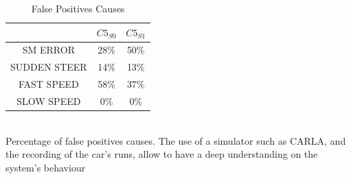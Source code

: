 \begin{table}
	\caption{False Positives Causes}
	\begin{center}
		\begin{tabular}{ |c|c|c| }
			\hline
			& $C5_{S0}$ & $C5_{S1}$ \\
			\hline
			SM ERROR & 28\% & 50\% \\
			\hline
			SUDDEN STEER & 14\% & 13\% \\
			\hline
			FAST SPEED & 58\% & 37\% \\
			\hline
			SLOW SPEED & 0\% & 0\% \\
			\hline
		\end{tabular}
		\\
		\vspace{0.3cm}
		Percentage of false positives causes. The use of a simulator such as CARLA, and the recording of the car's runs, allow to have a deep understanding on the system's behaviour
	\end{center}
\end{table}
